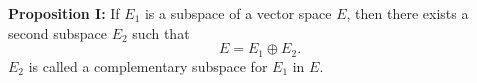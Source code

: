 \textbf{Proposition I:} If $E_1$ is a subspace of a vector space $E$, then there exists a second subspace $E_2$ such that
$$E = E_1 \oplus E_2.$$
$E_2$ is called a complementary subspace for $E_1$ in $E$.
